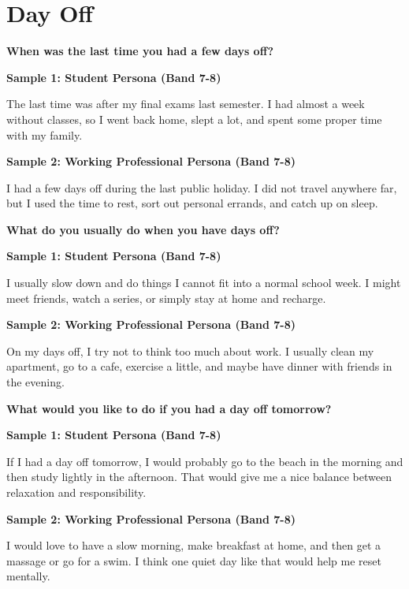 \newpage

\section{Day Off}
\begin{ieltsquestion}
\textbf{When was the last time you had a few days off?}
\end{ieltsquestion}
\textbf{Sample 1: Student Persona (Band 7-8)}

The last time was after my final exams last semester. I had almost a week without classes, so I went back home, slept a lot, and spent some proper time with my family.

\textbf{Sample 2: Working Professional Persona (Band 7-8)}

I had a few days off during the last public holiday. I did not travel anywhere far, but I used the time to rest, sort out personal errands, and catch up on sleep.

\separator

\begin{ieltsquestion}
\textbf{What do you usually do when you have days off?}
\end{ieltsquestion}
\textbf{Sample 1: Student Persona (Band 7-8)}

I usually slow down and do things I cannot fit into a normal school week. I might meet friends, watch a series, or simply stay at home and recharge.

\textbf{Sample 2: Working Professional Persona (Band 7-8)}

On my days off, I try not to think too much about work. I usually clean my apartment, go to a cafe, exercise a little, and maybe have dinner with friends in the evening.

\separator

\begin{ieltsquestion}
\textbf{What would you like to do if you had a day off tomorrow?}
\end{ieltsquestion}
\textbf{Sample 1: Student Persona (Band 7-8)}

If I had a day off tomorrow, I would probably go to the beach in the morning and then study lightly in the afternoon. That would give me a nice balance between relaxation and responsibility.

\textbf{Sample 2: Working Professional Persona (Band 7-8)}

I would love to have a slow morning, make breakfast at home, and then get a massage or go for a swim. I think one quiet day like that would help me reset mentally.

